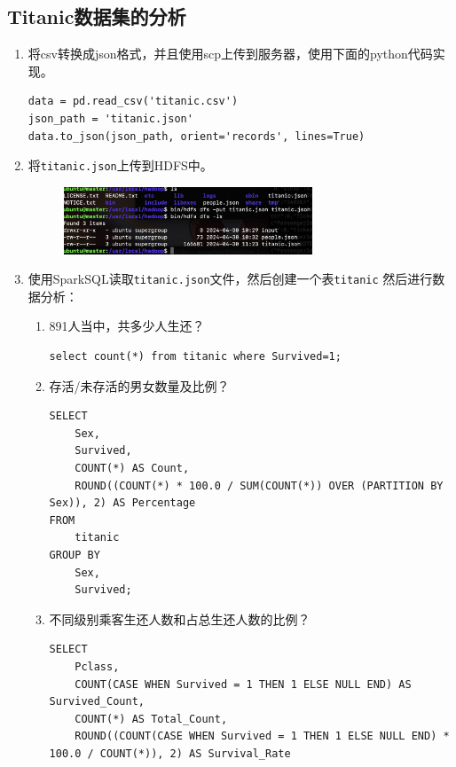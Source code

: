 \documentclass{article}
\begin{document}
\subsection{Titanic数据集的分析}
\begin{enumerate}
    \item 将csv转换成json格式，并且使用scp上传到服务器，使用下面的python代码实现。
    \begin{lstlisting}[style=pythonstyle]
data = pd.read_csv('titanic.csv')
json_path = 'titanic.json'
data.to_json(json_path, orient='records', lines=True)
    \end{lstlisting}
    \item 将\texttt{titanic.json}上传到HDFS中。
    \begin{figure}
        \centering
        \includegraphics[width=0.7\textwidth]{uploadtitanic.png}
    \end{figure}
    \item 使用SparkSQL读取\texttt{titanic.json}文件，然后创建一个表\texttt{titanic}
    然后进行数据分析：
    \begin{enumerate}
        \item 891人当中，共多少人生还？
        \begin{lstlisting}[style=sqlstyle]
select count(*) from titanic where Survived=1;
        \end{lstlisting}
        \begin{figure}[H]
            \centering
            \includ
        \end{figure}
        \item 存活/未存活的男女数量及比例？
        \begin{lstlisting}[style=sqlstyle]
SELECT 
    Sex,
    Survived,
    COUNT(*) AS Count,
    ROUND((COUNT(*) * 100.0 / SUM(COUNT(*)) OVER (PARTITION BY Sex)), 2) AS Percentage
FROM 
    titanic
GROUP BY 
    Sex, 
    Survived;
        \end{lstlisting}
        \item 不同级别乘客生还人数和占总生还人数的比例？
        \begin{lstlisting}[style=sqlstyle]
SELECT 
    Pclass,
    COUNT(CASE WHEN Survived = 1 THEN 1 ELSE NULL END) AS Survived_Count,
    COUNT(*) AS Total_Count,
    ROUND((COUNT(CASE WHEN Survived = 1 THEN 1 ELSE NULL END) * 100.0 / COUNT(*)), 2) AS Survival_Rate

\end{lstlisting}
\end{enumerate}
\end{enumerate}
\end{document}
